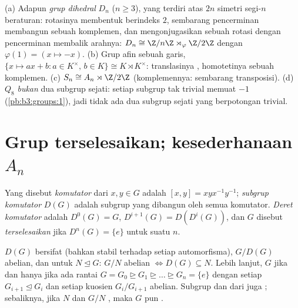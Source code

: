 \begin{example}\label{ex:b3:groups:semidirectexamples}
(a) Adapun \emph{grup dihedral} $D_n$ ($n \geq
3$), yang terdiri atas $2n$ simetri segi-$n$ beraturan: rotasinya membentuk
 berindeks $2$, sembarang pencerminan membangun sebuah
komplemen, dan mengonjugasikan sebuah rotasi dengan pencerminan membalik arahnya:
$D_n \cong \Z/n\Z \rtimes_\varphi \Z/2\Z$ dengan $\varphi(1) = (x
\mapsto -x)$.
(b) Grup afin sebuah garis, $\{x \mapsto ax + b : a \in
K^\times,\, b \in K\} \cong K \rtimes K^\times$: translasinya
, homotetinya sebuah komplemen.
(c) $S_n \cong A_n \rtimes \Z/2\Z$ (komplemennya: sembarang
transposisi).
(d)  $Q_8$ \emph{bukan} 
dua subgrup sejati: setiap subgrup tak trivial memuat $-1$
(\cref{pb:b3:groups:1}), jadi tidak ada dua subgrup sejati yang berpotongan
trivial.
\end{example}

\section{Grup terselesaikan; kesederhanaan \texorpdfstring{$A_n$}{A_n}}

\begin{definition}\label{def:b3:groups:derived}
Yang disebut \emph{komutator} dari $x, y \in G$ adalah $[x,y]
= xyx^{-1}y^{-1}$; \emph{subgrup komutator} $D(G)$ adalah subgrup yang dibangun oleh semua komutator.
\emph{Deret komutator} adalah $D^0(G) = G$, $D^{i+1}(G) = D(D^i(G))$,
dan $G$ disebut \emph{terselesaikan} jika $D^n(G) =
\{e\}$ untuk suatu $n$.
\end{definition}

\begin{proposition}\label{prop:b3:groups:derived}
$D(G)$ bersifat  (bahkan stabil terhadap setiap automorfisma), $G/D(G)$
abelian, dan untuk $N \trianglelefteq G$: $G/N$ abelian $\iff
D(G) \subseteq N$. Lebih lanjut, $G$  jika dan hanya jika ada rantai
$G = G_0 \trianglerighteq G_1 \trianglerighteq \dots
\trianglerighteq G_n = \{e\}$ dengan setiap $G_{i+1} \trianglelefteq
G_i$ dan setiap kuosien $G_i/G_{i+1}$ abelian. Subgrup dan
 dari  juga ; sebaliknya, jika $N$ dan
$G/N$ , maka $G$ pun .
\end{proposition}

